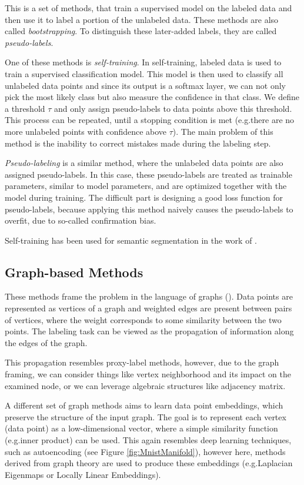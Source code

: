 This is a set of methods, that train a supervised model on the labeled data and then use it to label a portion of the unlabeled data. These methods are also called \emph{bootstrapping}. To distinguish these later-added labels, they are called \emph{pseudo-labels}.

One of these methods is \emph{self-training}. In self-training, labeled data is used to train a supervised classification model. This model is then used to classify all unlabeled data points and since its output is a softmax layer, we can not only pick the most likely class but also measure the confidence in that class. We define a threshold $\tau$ and only assign pseudo-labels to data points above this threshold. This process can be repeated, until a stopping condition is met (e.g.\@ there are no more unlabeled points with confidence above $\tau$). The main problem of this method is the inability to correct mistakes made during the labeling step.

\emph{Pseudo-labeling} is a similar method, where the unlabeled data points are also assigned pseudo-labels. In this case, these pseudo-labels are treated as trainable parameters, similar to model parameters, and are optimized together with the model during training. The difficult part is designing a good loss function for pseudo-labels, because applying this method naively causes the pseudo-labels to overfit, due to so-called confirmation bias.

Self-training has been used for semantic segmentation in the work of \cite{SelfTrainingSegmentation}.


\subsection{Graph-based Methods}

These methods frame the problem in the language of graphs (\cite{SslTechnicalReport}). Data points are represented as vertices of a graph and weighted edges are present between pairs of vertices, where the weight corresponds to some similarity between the two points. The labeling task can be viewed as the propagation of information along the edges of the graph.

This propagation resembles proxy-label methods, however, due to the graph framing, we can consider things like vertex neighborhood and its impact on the examined node, or we can leverage algebraic structures like adjacency matrix.

A different set of graph methods aims to learn data point embeddings, which preserve the structure of the input graph. The goal is to represent each vertex (data point) as a low-dimensional vector, where a simple similarity function (e.g.\@ inner product) can be used. This again resembles deep learning techniques, such as autoencoding (see Figure \ref{fig:MnistManifold}), however here, methods derived from graph theory are used to produce these embeddings (e.g.\@ Laplacian Eigenmaps or Locally Linear Embeddings).


